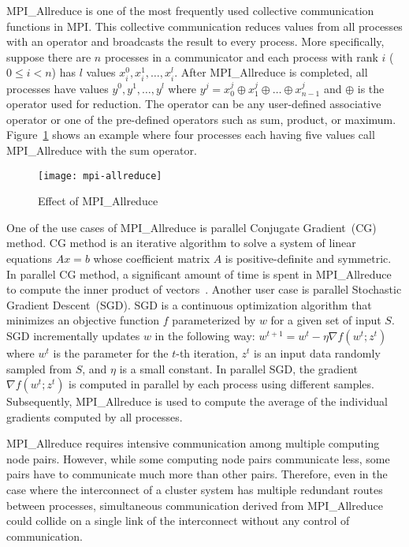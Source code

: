 MPI\_Allreduce is one of the most frequently used collective communication
functions in MPI\@. This collective communication reduces values from all
processes with an operator and broadcasts the result to every process.
More specifically, suppose there are $n$ processes in a communicator and
each process with rank $i$ ($0 \leq i < n$) has $l$ values $x_i^0, x_i^1,
\dots, x_i^l$. After MPI\_Allreduce is completed, all processes have values
$y^0, y^1, \dots, y^l$ where $y^j = x_0^j \oplus x_1^j \oplus \dots \oplus
x_{n-1}^j$ and $\oplus$ is the operator used for reduction. The operator can
be any user-defined associative operator or one of the pre-defined operators
such as sum, product, or maximum. Figure~\ref{fig:mpi-allreduce} shows an
example where four processes each having five values call MPI\_Allreduce with
the sum operator.

\begin{figure}
    \centering
    \texttt{[image: mpi-allreduce]}
    \caption{Effect of MPI\_Allreduce}%
    \label{fig:mpi-allreduce}
\end{figure}

One of the use cases of MPI\_Allreduce is parallel Conjugate Gradient~(CG)
method. CG method is an iterative algorithm to solve a system of linear
equations $Ax = b$ whose coefficient matrix $A$ is positive-definite and
symmetric. In parallel CG method, a significant amount of time is spent in
MPI\_Allreduce to compute the inner product of
vectors~\autocite{Kandalla2012}. Another user case is parallel Stochastic
Gradient Descent~(SGD). SGD is a continuous optimization algorithm that
minimizes an objective function $f$ parameterized by $w$ for a given set of
input $S$. SGD incrementally updates $w$ in the following way: $w^{t+1}=w^t-
\eta \nabla f(w^t; z^t)$ where $w^t$ is the parameter for the $t$-th
iteration, $z^t$ is an input data randomly sampled from $S$, and $\eta$ is a
small constant. In parallel SGD, the gradient $\nabla f(w^t; z^t)$ is computed
in parallel by each process using different samples. Subsequently,
MPI\_Allreduce is used to compute the average of the individual gradients
computed by all processes.

MPI\_Allreduce requires intensive communication among multiple
computing node pairs. However, while some computing node pairs communicate
less, some pairs have to communicate much more than other pairs. Therefore,
even in the case where the interconnect of a cluster system has multiple
redundant routes between processes, simultaneous communication derived from
MPI\_Allreduce could collide on a single link of the interconnect without any
control of communication.

